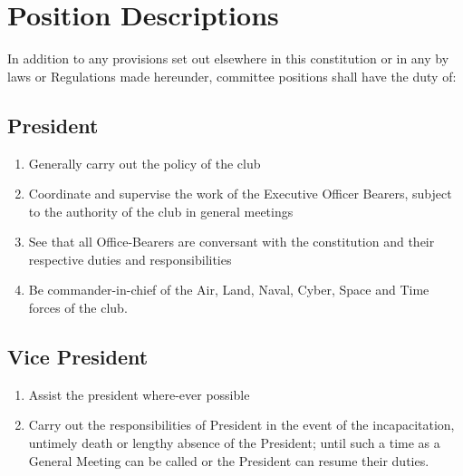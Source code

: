 \documentclass[10pt,a4paper]{report}
\begin{document}
	\section{Position Descriptions}
	In addition to any provisions set out elsewhere in this constitution or in any by laws or Regulations made hereunder, committee positions shall have the duty of:
		\subsection{President}
			\begin{enumerate}[label=\alph*]
				\item Generally carry out the policy of the club
				\item Coordinate and supervise the work of the Executive Officer Bearers, subject to the authority of the club in general meetings
				\item See that all Office-Bearers are conversant with the constitution and their respective duties and responsibilities
				\item Be commander-in-chief of the Air, Land, Naval, Cyber, Space and Time forces of the club.
			\end{enumerate}
		\subsection{Vice President}
			\begin{enumerate}[label=\alph*]
				\item Assist the president where-ever possible
				\item Carry out the responsibilities of President in the event of the incapacitation, untimely death or lengthy absence of the President; until such a time as a General Meeting can be called or the President can resume their duties.
			\end{enumerate}
\end{document}
